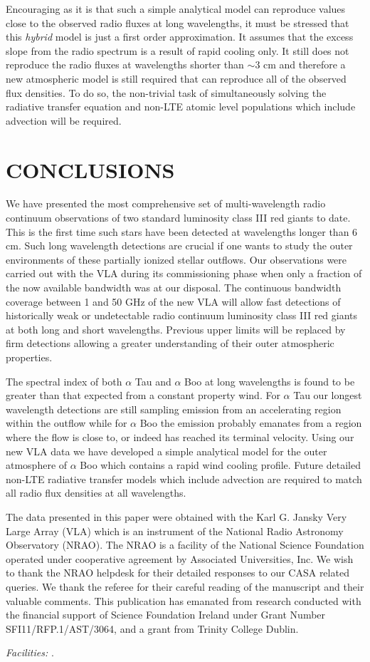 \documentclass[iop]{emulateapj}
\begin{document}
Encouraging as it is that such a simple analytical model can reproduce values close to the observed radio fluxes at long wavelengths, it must be stressed that this \textit{hybrid} model is just a first order approximation. It assumes that the excess slope from the radio spectrum is a result of rapid cooling only. It still does not reproduce the radio fluxes at wavelengths shorter than $\sim$3 cm and therefore a new atmospheric model is still required that can reproduce all of the observed flux densities. To do so, the non-trivial task of simultaneously solving the radiative transfer equation and non-LTE atomic level populations which include advection will be required.

\section{CONCLUSIONS}
We have presented the most comprehensive set of multi-wavelength radio continuum observations of two standard luminosity class III red giants to date. This is the first time such stars have been detected at wavelengths longer than 6 cm. Such long wavelength detections are crucial if one wants to study the outer environments of these partially ionized stellar outflows. Our observations were carried out with the VLA during its commissioning phase when only a fraction of the now available bandwidth was at our disposal. The continuous bandwidth coverage between 1 and 50 GHz of the new VLA will allow fast detections of historically weak or undetectable radio continuum luminosity class III red giants at both long and short wavelengths. Previous upper limits will be replaced by firm detections allowing a greater understanding of their outer atmospheric properties.

The spectral index of both $\alpha$ Tau and $\alpha$ Boo at long wavelengths is found to be greater than that expected from a constant property wind. For $\alpha$ Tau our longest wavelength detections are still sampling emission from an accelerating region within the outflow while for $\alpha$ Boo the emission probably emanates from a region where the flow is close to, or indeed has reached its terminal velocity. Using our new VLA data we have developed a simple analytical model for the outer atmosphere of $\alpha$ Boo which contains a rapid wind cooling profile. Future detailed non-LTE radiative transfer models which include advection are required to match all radio flux densities at all wavelengths. 


\acknowledgments
The data presented in this paper were obtained with the Karl G. Jansky Very Large Array (VLA) which is an instrument of the National Radio Astronomy Observatory (NRAO). The NRAO is a facility of the National Science Foundation operated under cooperative agreement by Associated Universities, Inc. We wish to thank the NRAO helpdesk for their detailed responses to our CASA related queries. We thank the referee for their careful reading of the manuscript and their valuable comments. This publication has emanated from research conducted with the financial support of Science Foundation Ireland under Grant Number SFI11/RFP.1/AST/3064, and a grant from Trinity College Dublin.

{\it Facilities:} .




\end{document}
